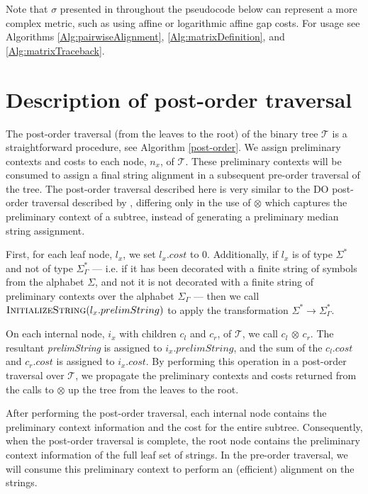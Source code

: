 \documentclass{bmcart}
\begin{document}
Note that $\sigma$ presented in throughout the pseudocode below can represent a more complex metric, such as using affine or logarithmic affine gap costs. For usage see Algorithms \ref{Alg:pairwiseAlignment},  \ref{Alg:matrixDefinition}, and \ref{Alg:matrixTraceback}.


\section*{Description of post-order traversal}
The post-order traversal (from the leaves to the root) of the binary tree $\mathcal{T}$ is a straightforward procedure, see Algorithm \ref{post-order}.
We assign preliminary contexts and costs to each node, $n_x$, of $\mathcal{T}$.
These preliminary contexts will be consumed to assign a final string alignment in a subsequent pre-order traversal of the tree.
The post-order traversal described here is very similar to the DO post-order traversal described by \cite{Wheeler2003}, differing only in the use of $\otimes$ which captures the preliminary context of a subtree, instead of generating a preliminary median string assignment.

First, for each leaf node, $l_x$, we set $l_x.cost$ to $0$.
Additionally, if $l_x$ is of type $\Sigma^{*}$ and not of type $\Sigma^{*}_{\Gamma}$ --- i.e. if it has been decorated with a finite string of symbols from the alphabet $\Sigma$, and not it is not decorated with a finite string of preliminary contexts over the alphabet $\Sigma_{\Gamma}$ --- then we call $\Call{InitializeString}{l_x.prelimString}$ to apply the transformation $\Sigma^{*} \rightarrow \Sigma^{*}_{\Gamma}$.

On each internal node, $i_x$ with children $c_l$ and $c_r$, of $\mathcal{T}$, we call $c_l$ $\otimes$ $c_r$.
The resultant \textit{prelimString} is assigned to $i_x.prelimString$, and the sum of the $c_l.cost$ and $c_r.cost$ is assigned to $i_x.cost$.
By performing this operation in a post-order traversal over $\mathcal{T}$, we propagate the preliminary contexts and costs returned from the calls to $\otimes$ up the tree from the leaves to the root.

After performing the post-order traversal, each internal node contains the preliminary context information and the cost for the entire subtree.
Consequently, when the post-order traversal is complete, the root node contains the preliminary context information of the full leaf set of strings.
In the pre-order traversal, we will consume this preliminary context to perform an (efficient) alignment on the strings.
\end{document}

